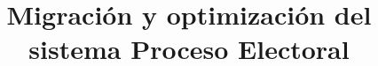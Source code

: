 \documentclass[12pt,oneside]{book}
\begin{document}
	
	\frontmatter
	
	
	
	
	
	
	
	
	
	
	\informe %
	\proyecto{} 
	\title{Migración y optimización del sistema Proceso Electoral}
	
\end{document}
